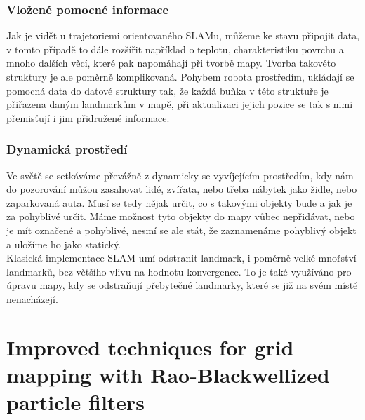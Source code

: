 \documentclass[11pt]{article}
\begin{document}
\subsubsection{Vložené pomocné informace}
Jak je vidět u trajetoriemi orientovaného SLAMu, můžeme ke stavu připojit data, v tomto případě to dále rozšířit například o teplotu, charakteristiku povrchu a mnoho dalších věcí, které pak napomáhají při tvorbě mapy. Tvorba takovéto struktury je ale poměrně komplikovaná. Pohybem robota prostředím, ukládají se pomocná data do datové struktury tak, že každá buňka v této struktuře je přiřazena daným landmarkům v mapě, při aktualizaci jejich pozice se tak s nimi přemisťují i jim přidružené informace. 
\subsubsection{Dynamická prostředí}
Ve světě se setkáváme převážně z dynamicky se vyvíjejícím prostředím, kdy nám do pozorování můžou zasahovat lidé, zvířata, nebo třeba nábytek jako židle, nebo zaparkovaná auta. Musí se tedy nějak určit, co s takovými objekty bude a jak je za pohyblivé určit. Máme možnost tyto objekty do mapy vůbec nepřidávat, nebo je mít označené a pohyblivé, nesmí se ale stát, že zaznamenáme pohyblivý objekt a uložíme ho jako statický. \\
\indent Klasická implementace SLAM umí odstranit landmark, i poměrně velké mnořství landmarků, bez většího vlivu na hodnotu konvergence. To je také využíváno pro úpravu mapy, kdy se odstraňují přebytečné landmarky, které se již na svém místě nenacházejí. 

\section{Improved techniques for grid mapping with Rao-Blackwellized particle filters}
\end{document}
